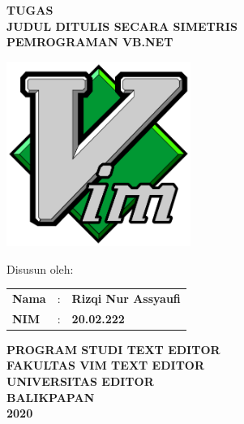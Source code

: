 \documentclass[oneside,listof=totoc]{scrbook}
\begin{document}
\frontmatter

\clearpage
\thispagestyle{empty}

\begin{center}
  \LARGE{\textbf{TUGAS}}\\
  \vspace{1.0cm}
  \Large{\textbf{JUDUL DITULIS SECARA SIMETRIS}}\\
  \Large{\textbf{PEMROGRAMAN VB.NET}}\\
\end{center}

\vspace{2.0cm}

\begin{minipage}{13cm}
  \centering
    \includegraphics[width=6cm]{figures/vim_logo}
\end{minipage}

\vspace{1.5cm}

\begin{center}
  \normalsize{Disusun oleh:}\\
  \vspace{0.5cm}
  \begin{minipage}{\textwidth}
    \begin{center}
      \begin{tabular}{l r l}
        \textbf{Nama}  & : & \textbf{Rizqi Nur Assyaufi}\\
        \textbf{NIM}   & : & \textbf{20.02.222}
      \end{tabular}
    \end{center}
  \end{minipage}
\end{center}

\vspace{2.0cm}

\begin{center}
  \large{\textbf{PROGRAM STUDI TEXT EDITOR}}\\
  \large{\textbf{FAKULTAS VIM TEXT EDITOR }}\\
  \large{\textbf{UNIVERSITAS EDITOR}}\\
  \large{\textbf{BALIKPAPAN}}\\
  \large{\textbf{2020}}
\end{center}
\end{document}
